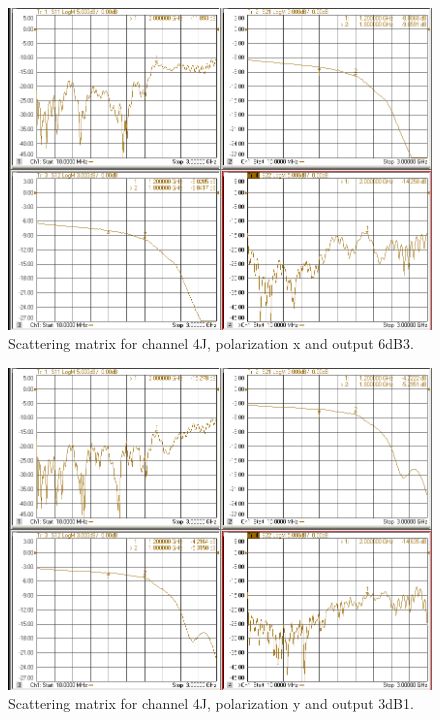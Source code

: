 \documentclass[12pt,a4paper,oneside]{article}
\begin{document}
\begin{figure}[H]
\centering
\includegraphics[width=0.9\linewidth]{VNA_results/4Jx_6dB3.png}
\caption{Scattering matrix for channel 4J, polarization x and output 6dB3.}
\label{fig:4Jx_6dB3}
\end{figure}


\begin{figure}[H]
\centering
\includegraphics[width=0.9\linewidth]{VNA_results/4Jy_3dB1.png}
\caption{Scattering matrix for channel 4J, polarization y and output 3dB1.}
\label{fig:4Jy_3dB1}
\end{figure}
\end{document}
